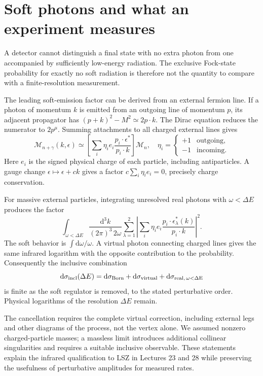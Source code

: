 \documentclass[11pt]{article}
\newcommand{\dd}{\mathrm d}
\newcommand{\module}[1]{\clearpage\section{#1}}
\newcommand{\cM}{\mathcal M}
\begin{document}
\module{Soft photons and what an experiment measures}
A detector cannot distinguish a final state with no extra photon from
one accompanied by sufficiently low-energy radiation. The exclusive
Fock-state probability for exactly no soft radiation is therefore not
the quantity to compare with a finite-resolution measurement.

The leading soft-emission factor can be derived from an external
fermion line. If a photon of momentum \(k\) is emitted from an outgoing
line of momentum \(p\), its adjacent propagator has
\((p+k)^2-M^2\simeq2p\cdot k\). The Dirac equation reduces the numerator
to \(2p^\mu\). Summing attachments to all charged external lines gives
\begin{equation}
 \cM_{n+\gamma}(k,\epsilon)
 \simeq\left[\sum_i\eta_i e_i
 \frac{p_i\cdot\epsilon^*}{p_i\cdot k}\right]\cM_n,
 \quad
 \eta_i=\begin{cases}+1&\text{outgoing},\\-1&\text{incoming}.
 \end{cases}
\end{equation}
Here \(e_i\) is the signed physical charge of each particle, including
antiparticles. A gauge change \(\epsilon\mapsto\epsilon+ck\) gives a
factor \(c\sum_i\eta_i e_i=0\), precisely charge conservation.

For massive external particles, integrating unresolved real photons
with \(\omega<\Delta E\) produces the factor
\begin{equation}
 \int_{\omega<\Delta E}\frac{\dd^3k}{(2\pi)^3\,2\omega}
 \sum_{\lambda=1}^2
 \left|\sum_i\eta_i e_i
 \frac{p_i\cdot\epsilon_\lambda^*(k)}{p_i\cdot k}\right|^2.
\end{equation}
The soft behavior is \(\int\dd\omega/\omega\). A virtual photon
connecting charged lines gives the same infrared logarithm with the
opposite contribution to the probability. Consequently the inclusive
combination
\begin{equation}
 \dd\sigma_{\rm incl}(\Delta E)
 =\dd\sigma_{\rm Born}+\dd\sigma_{\rm virtual}
 +\dd\sigma_{\rm real,\,\omega<\Delta E}
\end{equation}
is finite as the soft regulator is removed, to the stated perturbative
order. Physical logarithms of the resolution \(\Delta E\) remain.

The cancellation requires the complete virtual correction, including
external legs and other diagrams of the process, not the vertex alone.
We assumed nonzero charged-particle masses; a massless limit introduces
additional collinear singularities and requires a suitable inclusive
observable. These statements explain the infrared qualification to LSZ
in Lectures 23 and 28 while preserving the usefulness of perturbative
amplitudes for measured rates.
\end{document}
